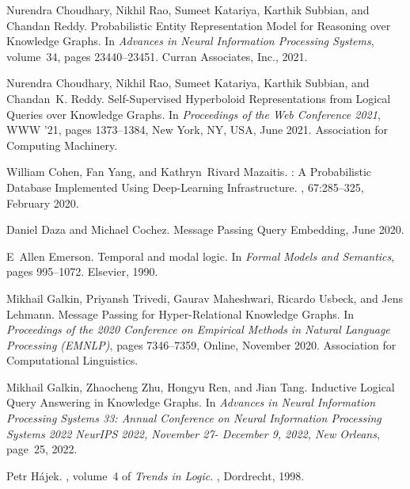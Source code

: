 \documentclass[11pt]{article}
\begin{document}
\begin{thebibliography}{10}
Nurendra Choudhary, Nikhil Rao, Sumeet Katariya, Karthik Subbian, and Chandan
  Reddy.
\newblock Probabilistic {{Entity Representation Model}} for {{Reasoning}} over
  {{Knowledge Graphs}}.
\newblock In {\em Advances in {{Neural Information Processing Systems}}},
  volume~34, pages 23440--23451. {Curran Associates, Inc.}, 2021.

Nurendra Choudhary, Nikhil Rao, Sumeet Katariya, Karthik Subbian, and
  Chandan~K. Reddy.
\newblock Self-{{Supervised Hyperboloid Representations}} from {{Logical
  Queries}} over {{Knowledge Graphs}}.
\newblock In {\em Proceedings of the {{Web Conference}} 2021}, {{WWW}} '21,
  pages 1373--1384, {New York, NY, USA}, June 2021. {Association for Computing
  Machinery}.

William Cohen, Fan Yang, and Kathryn~Rivard Mazaitis.
: {{A Probabilistic Database Implemented Using
  Deep-Learning Infrastructure}}.
, 67:285--325,
  February 2020.

Daniel Daza and Michael Cochez.
\newblock Message {{Passing Query Embedding}}, June 2020.

E~Allen Emerson.
\newblock Temporal and modal logic.
\newblock In {\em Formal Models and Semantics}, pages 995--1072. Elsevier,
  1990.

Mikhail Galkin, Priyansh Trivedi, Gaurav Maheshwari, Ricardo Usbeck, and Jens
  Lehmann.
\newblock Message {{Passing}} for {{Hyper-Relational Knowledge Graphs}}.
\newblock In {\em Proceedings of the 2020 {{Conference}} on {{Empirical
  Methods}} in {{Natural Language Processing}} ({{EMNLP}})}, pages 7346--7359,
  {Online}, November 2020. {Association for Computational Linguistics}.

Mikhail Galkin, Zhaocheng Zhu, Hongyu Ren, and Jian Tang.
\newblock Inductive {{Logical Query Answering}} in {{Knowledge Graphs}}.
\newblock In {\em Advances in {{Neural Information Processing Systems}} 33:
  {{Annual Conference}} on {{Neural Information Processing Systems}} 2022
  {{NeurIPS}} 2022, {{November}} 27- {{December}} 9, 2022, {{New Orleans}}},
  page~25, 2022.

Petr H{\'a}jek.
, volume~4 of {\em Trends in
  {{Logic}}}.
, {Dordrecht}, 1998.


\end{thebibliography}
\end{document}
